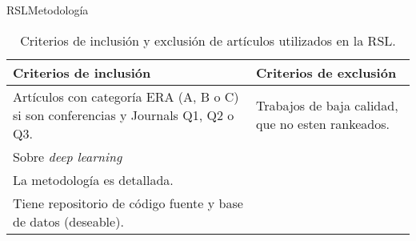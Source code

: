 \documentclass[10pt]{beamer}
\newcommand{\1}{
	\setbeamertemplate{background}{
		\texttt{[image: img/1]}
		\tikz[overlay] \fill[fill opacity=0.75,fill=white] (0,0) rectangle (-\paperwidth,\paperheight);
	}
}
\begin{document}
\begin{frame}{RSL}{Metodología}
	
\begin{table}[H]
	\begin{center}
		\caption{Criterios de inclusión y exclusión de artículos utilizados en la RSL.}
		\label{tab:criterios}
		\setlength{\tabcolsep}{0.5em} %
		{\renewcommand{\arraystretch}{1.2}%
			\begin{tabular}{p{5cm}p{5cm}}
				\textbf{Criterios de inclusión}                                                   & \textbf{Criterios de exclusión}                                                           \\ \hline
				Artículos con categoría ERA (A, B o C) si son conferencias y Journals Q1, Q2 o Q3. & Trabajos de baja calidad, que no esten rankeados.                                      \\
				Sobre \textit{deep learning}                \\
				La metodología es detallada.                                                                                                               &                                                                                                        \\
				Tiene repositorio de código fuente y base de datos (deseable).                                          &                                                                                                        \\
				                                                                                                       
			\end{tabular}
		}
	\end{center}
\end{table}
	
\end{frame}
\end{document}
